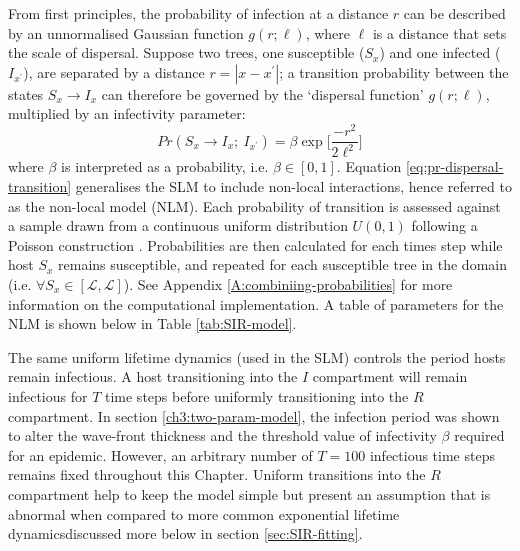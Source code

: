 From first principles, the probability of infection at a distance $r$ can be described by an unnormalised Gaussian function $g(r; \ell)$,
where $\ell$ is a distance that sets the scale of dispersal. 
Suppose two trees, one susceptible ($S_x$) and one infected ($I_{x^\prime}$), are separated by a distance $r=|x - x^\prime|$;
a transition probability between the states $S_x \rightarrow I_x$ can therefore be governed by the `dispersal function' $g(r; \ell)$, multiplied by an infectivity parameter:
\begin{equation}
\label{eq:pr-dispersal-transition}
    Pr(S_{x} \rightarrow I_{x} ;\ I_{x^{\prime}} ) = \beta \exp\Big[\frac{-r^2}{2\ell^2}\Big]
\end{equation}
where $\beta$ is interpreted as a probability, i.e. $\beta \in [0, 1]$. 
Equation \ref{eq:pr-dispersal-transition} generalises the SLM to include non-local interactions, hence referred to as the non-local model (NLM).
Each probability of transition is assessed against a sample drawn from a continuous uniform distribution $U(0, 1)$ following a Poisson construction \cite{cook2008constructing}. 
Probabilities are then calculated for each times step while host $S_x$ 
remains susceptible, and repeated for each susceptible tree in the domain (i.e. $\forall S_x \in [\mathcal{L}, \mathcal{L}]$).
See Appendix \ref{A:combiniing-probabilities} for more information on the computational implementation. A table of parameters for the NLM is shown below in Table \ref{tab:SIR-model}.

The same uniform lifetime dynamics (used in the SLM) controls the period hosts remain infectious.
A host transitioning into the $I$ compartment will remain infectious for $T$ time steps before uniformly transitioning into the $R$ compartment.
In section \ref{ch3:two-param-model}, the infection period was shown to alter the wave-front thickness and the threshold value of infectivity $\beta$ required for an epidemic. 
However, an arbitrary number of $T=100$ infectious time steps remains fixed throughout this Chapter.
Uniform transitions into the $R$ compartment help to keep the model simple but present an assumption that is abnormal when compared to more common exponential lifetime dynamics\textemdash discussed more below in section \ref{sec:SIR-fitting}.

